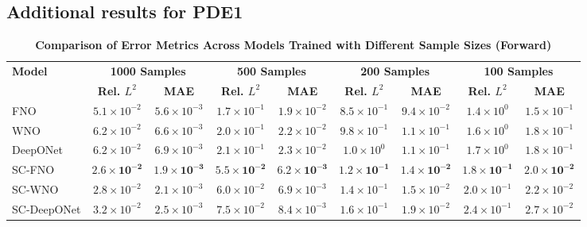 \subsection*{Additional results for PDE1}

\begin{table}[ht!]
\centering
\caption{\scriptsize\textbf{Comparison of Error Metrics Across Models Trained with Different Sample Sizes (Forward)}}
\label{tab:pde1_forward_nostd}
\scriptsize
\setlength{\tabcolsep}{3pt}
\begin{tabular}{lcccccccc}
\hline
\textbf{Model} & \multicolumn{2}{c}{\textbf{1000 Samples}} & \multicolumn{2}{c}{\textbf{500 Samples}} & \multicolumn{2}{c}{\textbf{200 Samples}} & \multicolumn{2}{c}{\textbf{100 Samples}} \\
 & \textbf{Rel. \(L^2\)} & \textbf{MAE} & \textbf{Rel. \(L^2\)} & \textbf{MAE} & \textbf{Rel. \(L^2\)} & \textbf{MAE} & \textbf{Rel. \(L^2\)} & \textbf{MAE} \\
\hline
FNO        & \(5.1 \times 10^{-2}\) & \(5.6 \times 10^{-3}\) & \(1.7 \times 10^{-1}\) & \(1.9 \times 10^{-2}\) & \(8.5 \times 10^{-1}\) & \(9.4 \times 10^{-2}\) & \(1.4 \times 10^{0}\) & \(1.5 \times 10^{-1}\) \\
WNO        & \(6.2 \times 10^{-2}\) & \(6.6 \times 10^{-3}\) & \(2.0 \times 10^{-1}\) & \(2.2 \times 10^{-2}\) & \(9.8 \times 10^{-1}\) & \(1.1 \times 10^{-1}\) & \(1.6 \times 10^{0}\) & \(1.8 \times 10^{-1}\) \\
DeepONet   & \(6.2 \times 10^{-2}\) & \(6.9 \times 10^{-3}\) & \(2.1 \times 10^{-1}\) & \(2.3 \times 10^{-2}\) & \(1.0 \times 10^{0}\) & \(1.1 \times 10^{-1}\) & \(1.7 \times 10^{0}\) & \(1.8 \times 10^{-1}\) \\
SC-FNO     & \(\mathbf{2.6 \times 10^{-2}}\) & \(\mathbf{1.9 \times 10^{-3}}\) & \(\mathbf{5.5 \times 10^{-2}}\) & \(\mathbf{6.2 \times 10^{-3}}\) & \(\mathbf{1.2 \times 10^{-1}}\) & \(\mathbf{1.4 \times 10^{-2}}\) & \(\mathbf{1.8 \times 10^{-1}}\) & \(\mathbf{2.0 \times 10^{-2}}\) \\
SC-WNO     & \(2.8 \times 10^{-2}\) & \(2.1 \times 10^{-3}\) & \(6.0 \times 10^{-2}\) & \(6.9 \times 10^{-3}\) & \(1.4 \times 10^{-1}\) & \(1.5 \times 10^{-2}\) & \(2.0 \times 10^{-1}\) & \(2.2 \times 10^{-2}\) \\
SC-DeepONet& \(3.2 \times 10^{-2}\) & \(2.5 \times 10^{-3}\) & \(7.5 \times 10^{-2}\) & \(8.4 \times 10^{-3}\) & \(1.6 \times 10^{-1}\) & \(1.9 \times 10^{-2}\) & \(2.4 \times 10^{-1}\) & \(2.7 \times 10^{-2}\) \\
\hline
\end{tabular}
\end{table}





